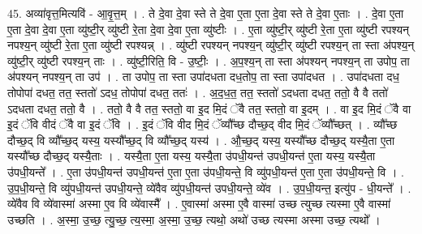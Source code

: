 \documentclass[17pt]{extarticle}
\begin{document}
45. अव्या॑वृत्त॒मित्यवि॑ - आ॒वृ॒त्त॒म् । . ते दे॒वा दे॒वा स्ते ते दे॒वा ए॒ता ए॒ता दे॒वा स्ते ते दे॒वा ए॒ताः । . दे॒वा ए॒ता ए॒ता दे॒वा दे॒वा ए॒ता व्यु॑ष्टी॒र् व्यु॑ष्टी रे॒ता दे॒वा दे॒वा ए॒ता व्यु॑ष्टीः । . ए॒ता व्यु॑ष्टी॒र् व्यु॑ष्टी रे॒ता ए॒ता व्यु॑ष्टी रपश्यन् नपश्य॒न् व्यु॑ष्टी रे॒ता ए॒ता व्यु॑ष्टी रपश्यन्न् । . व्यु॑ष्टी रपश्यन् नपश्य॒न् व्यु॑ष्टी॒र् व्यु॑ष्टी रपश्य॒न् ता स्ता अ॑पश्य॒न् व्यु॑ष्टी॒र् व्यु॑ष्टी रपश्य॒न् ताः । . व्यु॑ष्टी॒रिति॒ वि - उ॒ष्टीः॒ । . अ॒प॒श्य॒न् ता स्ता अ॑पश्यन् नपश्य॒न् ता उपोप॒ ता अ॑पश्यन् नपश्य॒न् ता उप॑ । . ता उपोप॒ ता स्ता उपा॑दधता दध॒तोप॒ ता स्ता उपा॑दधत । . उपा॑दधता दध॒ तोपोपा॑ दधत॒ तत॒ स्ततो॑ ऽदध॒ तोपोपा॑ दधत॒ ततः॑ । . अ॒द॒ध॒त॒ तत॒ स्ततो॑ ऽदधता दधत॒ ततो॒ वै वै ततो॑ ऽदधता दधत॒ ततो॒ वै । . ततो॒ वै वै तत॒ स्ततो॒ वा इ॒द मि॒दं ॅवै तत॒ स्ततो॒ वा इ॒दम् । . वा इ॒द मि॒दं ॅवै वा इ॒दं ॅवि वीदं ॅवै वा इ॒दं ॅवि । . इ॒दं ॅवि वीद मि॒दं ॅव्यौ᳚च्छ दौच्छ॒द् वीद मि॒दं ॅव्यौ᳚च्छत् । . व्यौ᳚च्छ दौच्छ॒द् वि व्यौ᳚च्छ॒द् यस्य॒ यस्यौ᳚च्छ॒द् वि व्यौ᳚च्छ॒द् यस्य॑ । . औ॒च्छ॒द् यस्य॒ यस्यौ᳚च्छ दौच्छ॒द् यस्यै॒ता ए॒ता यस्यौ᳚च्छ दौच्छ॒द् यस्यै॒ताः । . यस्यै॒ता ए॒ता यस्य॒ यस्यै॒ता उ॑पधी॒यन्त॑ उपधी॒यन्त॑ ए॒ता यस्य॒ यस्यै॒ता उ॑पधी॒यन्ते᳚ । . ए॒ता उ॑पधी॒यन्त॑ उपधी॒यन्त॑ ए॒ता ए॒ता उ॑पधी॒यन्ते॒ वि व्यु॑पधी॒यन्त॑ ए॒ता ए॒ता उ॑पधी॒यन्ते॒ वि । . उ॒प॒धी॒यन्ते॒ वि व्यु॑पधी॒यन्त॑ उपधी॒यन्ते॒ व्ये॑वैव व्यु॑पधी॒यन्त॑ उपधी॒यन्ते॒ व्ये॑व । . उ॒प॒धी॒यन्त॒ इत्यु॑प - धी॒यन्ते᳚ । . व्ये॑वैव वि व्ये॑वास्मा॑ अस्मा ए॒व वि व्ये॑वास्मै᳚ । . ए॒वास्मा॑ अस्मा ए॒वै वास्मा॑ उच्छ त्युच्छ त्यस्मा ए॒वै वास्मा॑ उच्छति । . अ॒स्मा॒ उ॒च्छ॒ त्यु॒च्छ॒ त्य॒स्मा॒ अ॒स्मा॒ उ॒च्छ॒ त्यथो॒ अथो॑ उच्छ त्यस्मा अस्मा उच्छ॒ त्यथो᳚ । \newline
\end{document}
